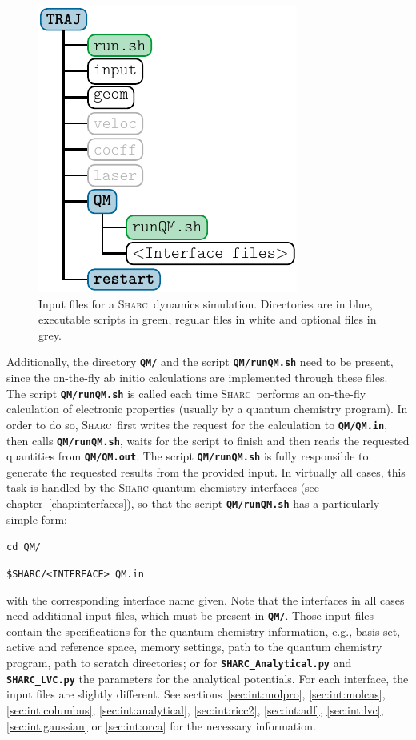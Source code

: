 \documentclass[a4paper,10pt,DIV=15,openany]{scrbook}
\newcommand{\sharc}{\textsc{Sharc}}
\newcommand{\ttt}[1]{\textbf{\texttt{#1}}}
\newenvironment{example}{
  \setlength{\OuterFrameSep}{3pt}
  \vspace{0mm}
  \definecolor{shadecolor}{HTML}{E4F4FF}
  \begin{shaded}
}{
  \end{shaded}
}
\begin{document}
\begin{figure}[htb]
  \centering
  \includegraphics[scale=1]{img/dir_traj/dir_traj.pdf}
  \caption[Input files for a \sharc\ dynamics simulation.]{Input files for a \sharc\ dynamics simulation. Directories are in blue, executable scripts in green, regular files in white and optional files in grey.}
  \label{fig:dir_traj}
\end{figure}

Additionally, the directory \ttt{QM/} and the script \ttt{QM/runQM.sh} need to be present, since the on-the-fly ab initio calculations are implemented through these files. The script \ttt{QM/runQM.sh} is called each time \sharc\ performs an on-the-fly calculation of electronic properties (usually by a quantum chemistry program). In order to do so, \sharc\ first writes the request for the calculation to \ttt{QM/QM.in}, then calls \ttt{QM/runQM.sh}, waits for the script to finish and then reads the requested quantities from \ttt{QM/QM.out}. The script \ttt{QM/runQM.sh} is fully responsible to generate the requested results from the provided input. 
In virtually all cases, this task is handled by the \sharc-quantum chemistry interfaces (see chapter~\ref{chap:interfaces}), so that the script \ttt{QM/runQM.sh} has a particularly simple form:
\begin{example}
\verb|cd QM/|

\verb|$SHARC/<INTERFACE> QM.in |
\end{example}
with the corresponding interface name given. Note that the interfaces in all cases need additional input files, which must be present in \ttt{QM/}. Those input files contain the specifications for the quantum chemistry information, e.g., basis set, active and reference space, memory settings, path to the quantum chemistry program, path to scratch directories; or for \ttt{SHARC\_Analytical.py} and \ttt{SHARC\_LVC.py} the parameters for the analytical potentials. For each interface, the input files are slightly different. See sections~\ref{sec:int:molpro}, \ref{sec:int:molcas}, \ref{sec:int:columbus}, \ref{sec:int:analytical}, \ref{sec:int:ricc2}, \ref{sec:int:adf}, \ref{sec:int:lvc}, \ref{sec:int:gaussian} or \ref{sec:int:orca} for the necessary information.
\end{document}

